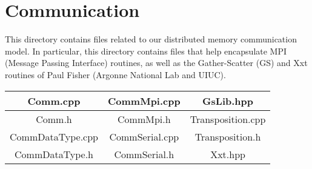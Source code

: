 %
\section{Communication}

This directory contains files related to our distributed memory communication model.   In particular, this directory contains files that help encapsulate MPI (Message Passing Interface) routines, as well
as the Gather-Scatter (GS) and Xxt routines of Paul Fisher (Argonne National Lab and UIUC).

\begin{center}
\begin{tabular}{|c | c | c |} \hline
Comm.cpp &		CommMpi.cpp	&	GsLib.hpp \\ \hline
Comm.h	&		CommMpi.h	&	Transposition.cpp  \\ \hline
CommDataType.cpp &	CommSerial.cpp	&	Transposition.h  \\ \hline
CommDataType.h	&	CommSerial.h &		Xxt.hpp  \\ \hline
\end{tabular}
\end{center}